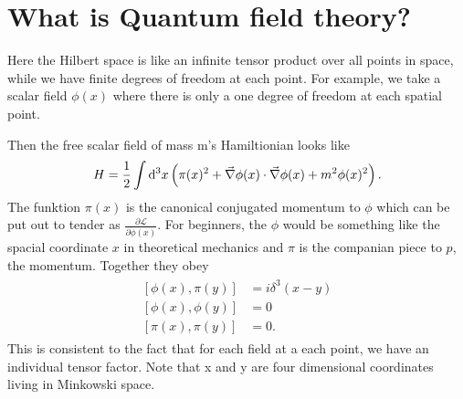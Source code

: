\section{What is Quantum field theory? \checkmark}
	Here the Hilbert space is like an infinite tensor product over all points in space, while we have finite degrees of freedom at each point. 
For example, we take a scalar field $\phi(x)$ where there is only a one degree of freedom at each spatial point. 

	Then the free scalar field of mass m's Hamiltionian looks like
		\begin{equation}
			H=\frac{1}{2}\int \mathrm{d}^3 x \left(\pi(x)^2 + \vec{\nabla}\phi(x) \cdot \vec{\nabla}\phi(x) + m^2\phi(x)^2 \right).
		\end{equation}
	The funktion $\pi(x)$ is the canonical conjugated momentum to $\phi$ which can be put out to tender as $\frac{\partial \mathscr{L}}{\partial \dot{\phi}(x)}$. For beginners, the $\phi$ would be something like the spacial coordinate $x$ in theoretical mechanics and $\pi$ is the companian piece to $p$, the momentum.
	Together they obey
		\begin{align}
			\begin{split}
				[\phi(x),\pi(y)]&=i \delta^3(x-y) \\
				[\phi(x),\phi(y)]&=0 \\
				[\pi(x),\pi(y)]&=0.
			\end{split}
		\end{align}
	This is consistent to the fact that for each field at a each point, we have an individual tensor factor. Note that x and y are four dimensional coordinates living in Minkowski space.
			
